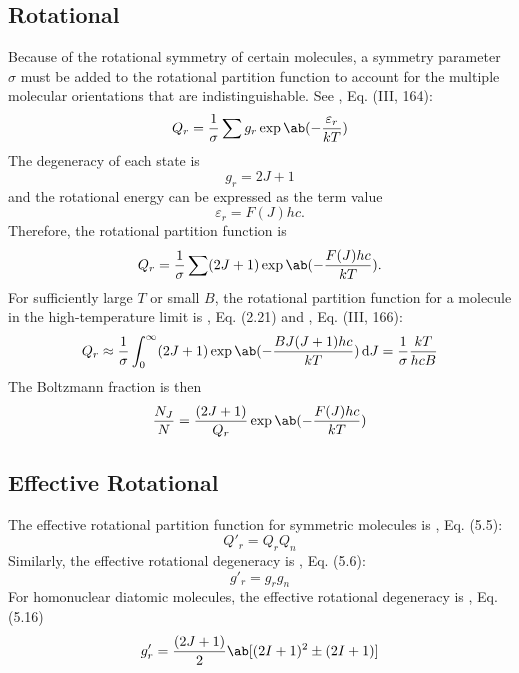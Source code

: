\documentclass[11pt, twoside, fleqn]{report}
\begin{document}
\subsection{Rotational}
Because of the rotational symmetry of certain molecules, a symmetry parameter $\sigma$ must be added to the rotational partition function to account for the multiple molecular orientations that are indistinguishable.
See \cite{herzbergMolecularSpectraMolecular1950}, Eq. (III, 164):
\begin{equation*}
    Q_r = \frac{1}{\sigma} \sum g_r\exp\ab(-\frac{\varepsilon_r}{kT})
\end{equation*}
The degeneracy of each state is
\begin{equation*}
    g_r = 2J + 1
\end{equation*}
and the rotational energy can be expressed as the term value
\begin{equation*}
    \varepsilon_r = F(J)hc.
\end{equation*}
Therefore, the rotational partition function is
\begin{equation*}
    Q_r = \frac{1}{\sigma} \sum (2J + 1)\exp\ab(-\frac{F(J)hc}{kT}).
\end{equation*}
For sufficiently large $T$ or small $B$, the rotational partition function for a molecule in the high-temperature limit is \cite{hansonSpectroscopyOpticalDiagnostics2016}, Eq. (2.21) and \cite{herzbergMolecularSpectraMolecular1950}, Eq. (III, 166):
\begin{equation*}
    Q_r \approx \frac{1}{\sigma} \int_0^{\infty} (2J + 1)\exp\ab(-\frac{BJ(J + 1)hc}{kT}) \odif{J} = \frac{1}{\sigma}\frac{kT}{hcB}
\end{equation*}
The Boltzmann fraction is then
\begin{equation*}
    \frac{N_J}{N} = \frac{(2J + 1)}{Q_r}\exp\ab(-\frac{F(J)hc}{kT})
\end{equation*}

\subsection{Effective Rotational}

The effective rotational partition function for symmetric molecules is \cite{hansonSpectroscopyOpticalDiagnostics2016}, Eq. (5.5):
\begin{equation*}
    Q'_r = Q_rQ_n
\end{equation*}
Similarly, the effective rotational degeneracy is \cite{hansonSpectroscopyOpticalDiagnostics2016}, Eq. (5.6):
\begin{equation*}
    g'_r = g_rg_n
\end{equation*}
For homonuclear diatomic molecules, the effective rotational degeneracy is \cite{hansonSpectroscopyOpticalDiagnostics2016}, Eq. (5.16)
\begin{equation*}
    g'_r = \frac{(2J + 1)}{2}\ab[(2I + 1)^2 \pm (2I + 1)]
\end{equation*}
\end{document}
